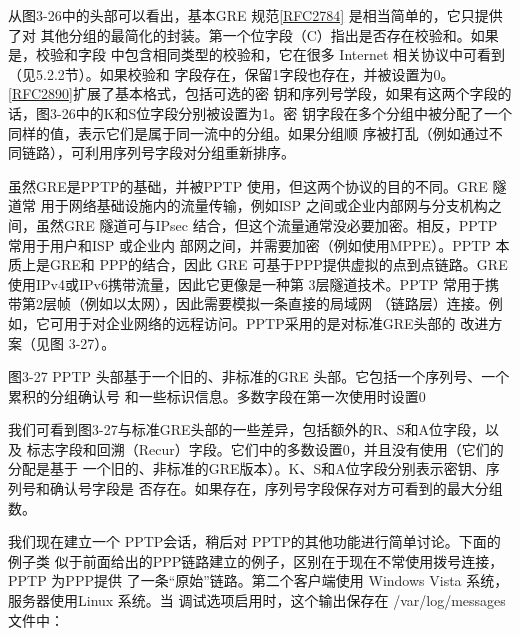 从图3-26中的头部可以看出，基本GRE 规范\href{https://www.rfc-editor.org/rfc/rfc2784}{[RFC2784]} 是相当简单的，它只提供了对
其他分组的最简化的封装。第一个位字段（C）指出是否存在校验和。如果是，校验和字段
中包含相同类型的校验和，它在很多 Internet 相关协议中可看到（见5.2.2节）。如果校验和
字段存在，保留1字段也存在，并被设置为0。\href{https://www.rfc-editor.org/rfc/rfc2890}{[RFC2890]}扩展了基本格式，包括可选的密
钥和序列号学段，如果有这两个字段的话，图3-26中的K和S位字段分别被设置为1。密
钥字段在多个分组中被分配了一个同样的值，表示它们是属于同一流中的分组。如果分组顺
序被打乱（例如通过不同链路），可利用序列号字段对分组重新排序。

虽然GRE是PPTP的基础，并被PPTP 使用，但这两个协议的目的不同。GRE 隧道常
用于网络基础设施内的流量传输，例如ISP 之间或企业内部网与分支机构之间，虽然GRE
隧道可与IPsec 结合，但这个流量通常没必要加密。相反，PPTP 常用于用户和ISP 或企业内
部网之间，并需要加密（例如使用MPPE）。PPTP 本质上是GRE和 PPP的结合，因此 GRE
可基于PPP提供虚拟的点到点链路。GRE使用IPv4或IPv6携带流量，因此它更像是一种第
3层隧道技术。PPTP 常用于携带第2层帧（例如以太网），因此需要模拟一条直接的局域网
（链路层）连接。例如，它可用于对企业网络的远程访问。PPTP采用的是对标准GRE头部的
改进方案（见图 3-27）。

图3-27 PPTP 头部基于一个旧的、非标准的GRE 头部。它包括一个序列号、一个累积的分组确认号
和一些标识信息。多数字段在第一次使用时设置0

我们可看到图3-27与标准GRE头部的一些差异，包括额外的R、S和A位字段，以及
标志字段和回溯（Recur）字段。它们中的多数设置0，并且没有使用（它们的分配是基于
一个旧的、非标准的GRE版本）。K、S和A位字段分别表示密钥、序列号和确认号字段是
否存在。如果存在，序列号字段保存对方可看到的最大分组数。

我们现在建立一个 PPTP会话，稍后对 PPTP的其他功能进行简单讨论。下面的例子类
似于前面给出的PPP链路建立的例子，区别在于现在不常使用拨号连接，PPTP 为PPP提供
了一条“原始”链路。第二个客户端使用 Windows Vista 系统，服务器使用Linux 系统。当
调试选项启用时，这个输出保存在 /var/log/messages 文件中：

